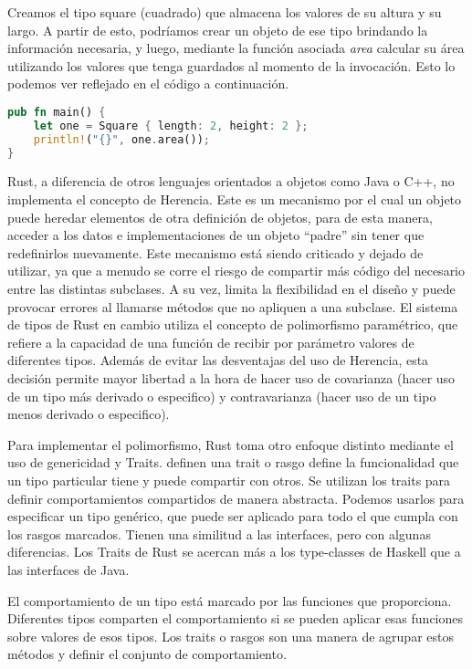 Creamos el tipo square (cuadrado) que almacena los valores de su altura y su largo. A partir de esto, podríamos crear un objeto de ese tipo brindando la información necesaria, y luego, mediante la función asociada \textit{area} calcular su área utilizando los valores que tenga guardados al momento de la invocación. Esto lo podemos ver reflejado en el código a continuación.

\begin{lstlisting}[language=Rust]
pub fn main() {
    let one = Square { length: 2, height: 2 };
    println!("{}", one.area());
}
\end{lstlisting}

Rust, a diferencia de otros lenguajes orientados a objetos como Java o C++, no implementa el concepto de Herencia. Este es un mecanismo por el cual un objeto puede heredar elementos de otra definición de objetos, para de esta manera, acceder a los datos e implementaciones de un objeto ``padre'' sin tener que redefinirlos nuevamente.
Este mecanismo está siendo criticado y dejado de utilizar, ya que a menudo se corre el riesgo de compartir más código del necesario entre las distintas subclases. A su vez, limita la flexibilidad en el diseño y puede provocar errores al llamarse métodos que no apliquen a una subclase.
El sistema de tipos de Rust en cambio utiliza el concepto de polimorfismo paramétrico, que refiere a la capacidad de una función de recibir por parámetro valores de diferentes tipos. Además de evitar las desventajas del uso de Herencia, esta decisión permite mayor libertad a la hora de hacer uso de covarianza (hacer uso de un tipo más derivado o especifico) y contravarianza (hacer uso de un tipo menos derivado o especifico).

Para implementar el polimorfismo, Rust toma otro enfoque distinto mediante el uso de genericidad y Traits. \cite{rustbook} definen una trait o rasgo define la funcionalidad que un tipo particular tiene y puede compartir con otros. Se utilizan los traits para definir comportamientos compartidos de manera abstracta. Podemos usarlos para especificar un tipo genérico, que puede ser aplicado para todo el que cumpla con los rasgos marcados. Tienen una similitud a las interfaces, pero con algunas diferencias. Los Traits de Rust se acercan más a los type-classes de Haskell que a las interfaces de Java.

El comportamiento de un tipo está marcado por las funciones que proporciona. Diferentes tipos comparten el comportamiento si se pueden aplicar esas funciones sobre valores de esos tipos. Los traits o rasgos son una manera de agrupar estos métodos y definir el conjunto de comportamiento. 

